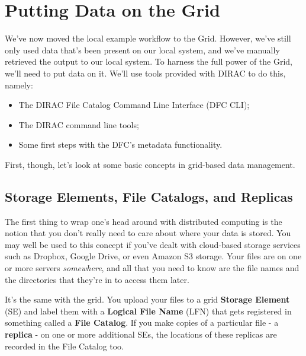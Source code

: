 \section{Putting Data on the Grid}
\label{sec:griddata}
We've now moved the local example workflow to the Grid.
However,
we've still only used data that's been present on our local system, and
we've manually retrieved the output to our local system. To harness the
full power of the Grid, we'll need to put data on it. We'll use tools
provided with DIRAC to do this, namely:

\begin{itemize}
\tightlist
\item The DIRAC File Catalog Command Line Interface (DFC CLI);
\item The DIRAC command line tools;
\item Some first steps with the DFC's metadata functionality.
\end{itemize}

First, though, let's look at some basic concepts in grid-based data
management.

\subsection{Storage Elements, File Catalogs, and Replicas}
\label{storage-elements-file-catalogs-and-replicas}
The first thing to wrap one's head around with distributed computing is
the notion that you don't really need to care about where your data is
stored. You may well be used to this concept if you've dealt with
cloud-based storage services such as Dropbox, Google Drive, or even
Amazon S3 storage. Your files are on one or more servers
\emph{somewhere}, and all that you need to know are the file names and
the directories that they're in to access them later.

It's the same with the grid. You upload your files to a grid
\textbf{Storage Element} (SE) and label them with a \textbf{Logical File
Name} (LFN) that gets registered in something called a \textbf{File
Catalog}. If you make copies of a particular file - a \textbf{replica} -
on one or more additional SEs, the locations of these replicas are
recorded in the File Catalog too.

